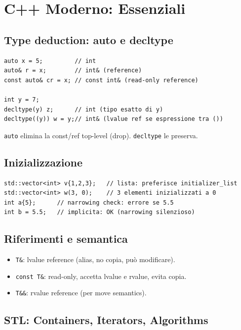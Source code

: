 \documentclass[11pt,a4paper]{article}
\theoremstyle{remark}
\begin{document}
\section{C++ Moderno: Essenziali}

\subsection{Type deduction: auto e decltype}

\begin{lstlisting}
auto x = 5;         // int
auto& r = x;        // int& (reference)
const auto& cr = x; // const int& (read-only reference)

int y = 7;
decltype(y) z;      // int (tipo esatto di y)
decltype((y)) w = y;// int& (lvalue ref se espressione tra ())
\end{lstlisting}

\texttt{auto} elimina la const/ref top-level (drop). \texttt{decltype} le preserva.

\subsection{Inizializzazione}

\begin{lstlisting}
std::vector<int> v{1,2,3};   // lista: preferisce initializer_list
std::vector<int> w(3, 0);    // 3 elementi inizializzati a 0
int a{5};      // narrowing check: errore se 5.5
int b = 5.5;   // implicita: OK (narrowing silenzioso)
\end{lstlisting}

\subsection{Riferimenti e semantica}

\begin{itemize}
  \item \texttt{T\&}: lvalue reference (alias, no copia, può modificare).
  \item \texttt{const T\&}: read-only, accetta lvalue e rvalue, evita copia.
  \item \texttt{T\&\&}: rvalue reference (per move semantics).
\end{itemize}

\subsection{STL: Containers, Iterators, Algorithms}
\end{document}
